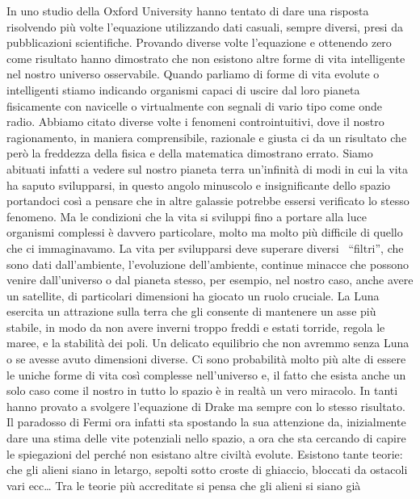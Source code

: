 \documentclass[12pt]{book} %
\begin{document}
\begin{mdframed}[linewidth=1pt]
In uno studio della Oxford University hanno tentato di dare una risposta
risolvendo più volte l'equazione utilizzando dati casuali, sempre diversi, presi da pubblicazioni scientifiche.
Provando diverse volte l'equazione e ottenendo zero come risultato hanno dimostrato che non
esistono altre forme di vita intelligente nel nostro universo osservabile. Quando parliamo di forme di vita evolute o
intelligenti stiamo indicando organismi capaci di uscire dal loro pianeta fisicamente con navicelle o virtualmente con
segnali di vario tipo come onde radio. Abbiamo citato diverse volte i fenomeni controintuitivi, dove il nostro
ragionamento, in maniera comprensibile, razionale e giusta ci da un risultato che però la freddezza della fisica e
della matematica dimostrano errato. Siamo abituati infatti a vedere sul nostro pianeta terra
un'infinità di modi in cui la vita ha saputo svilupparsi, in questo angolo minuscolo e
insignificante dello spazio portandoci così a pensare che in altre galassie potrebbe essersi verificato lo stesso
fenomeno. Ma le condizioni che la vita si sviluppi fino a portare alla luce organismi complessi è davvero particolare,
molto ma molto più difficile di quello che ci immaginavamo. La vita per svilupparsi deve superare diversi \ “filtri”,
che sono dati dall'ambiente, l'evoluzione dell'ambiente,
continue minacce che possono venire dall'universo o dal pianeta stesso, per esempio, nel nostro
caso, anche avere un satellite, di particolari dimensioni ha giocato un ruolo cruciale. La Luna esercita un attrazione
sulla terra che gli consente di mantenere un asse più stabile, in modo da non avere inverni troppo freddi e estati
torride, regola le maree, e la stabilità dei poli. Un delicato equilibrio che non avremmo senza Luna o se avesse avuto
dimensioni diverse. Ci sono probabilità molto più alte di essere le uniche forme di vita così complesse
nell'universo e, il fatto che esista anche un solo caso come il nostro in tutto lo spazio è in
realtà un vero miracolo. In tanti hanno provato a svolgere l'equazione di Drake ma sempre con lo
stesso risultato. Il paradosso di Fermi ora infatti sta spostando la sua attenzione da, inizialmente dare una stima
delle vite potenziali nello spazio, a ora che sta cercando di capire le spiegazioni del perché non esistano altre
civiltà evolute. Esistono tante teorie: che gli alieni siano {\textquotedbl}in letargo{\textquotedbl}, sepolti sotto
croste di ghiaccio, bloccati da ostacoli vari ecc… Tra le teorie più accreditate si pensa che gli alieni si siano già

\end{mdframed}
\end{document}
